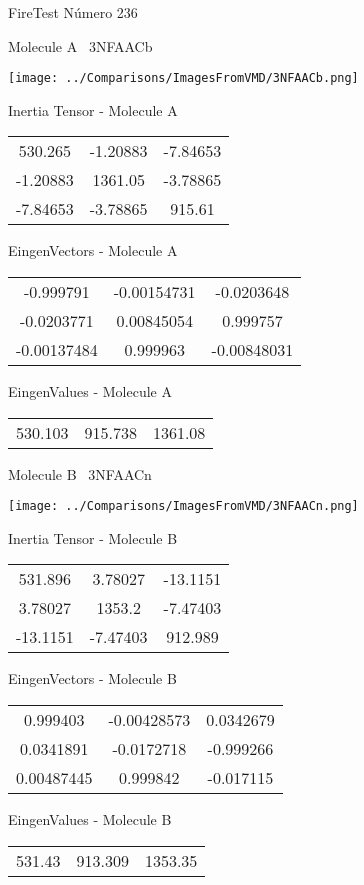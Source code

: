 \vtab[-3cm]
\begin{center}
{\large FireTest \tab Número 236}
\end{center}
\begin{multicols}{2}
\begin{center}

Molecule A \
3NFAACb

\texttt{[image: ../Comparisons/ImagesFromVMD/3NFAACb.png]}

Inertia Tensor - Molecule A \\
\begin{tabular}{|c c c|}
530.265	 & 	-1.20883	 & 	-7.84653	 \\
-1.20883	 & 	1361.05	 & 	-3.78865	 \\
-7.84653	 & 	-3.78865	 & 	915.61
\end{tabular}

\vtab
 EingenVectors - Molecule A     \\
\begin{tabular}{|c c c|}
-0.999791	 & 	-0.00154731	 & 	-0.0203648	 \\
-0.0203771	 & 	0.00845054	 & 	0.999757	 \\
-0.00137484	 & 	0.999963	 & 	-0.00848031
\end{tabular}

\vtab
 EingenValues - Molecule A     \\
\begin{tabular}{|c c c|}
530.103	 & 	915.738	 & 	1361.08	 \\
\end{tabular}
\columnbreak

Molecule B \
3NFAACn

\texttt{[image: ../Comparisons/ImagesFromVMD/3NFAACn.png]}

Inertia Tensor - Molecule B \\
\begin{tabular}{|c c c|}
531.896	 & 	3.78027	 & 	-13.1151	 \\
3.78027	 & 	1353.2	 & 	-7.47403	 \\
-13.1151	 & 	-7.47403	 & 	912.989
\end{tabular}

\vtab
 EingenVectors - Molecule B     \\
\begin{tabular}{|c c c|}
0.999403	 & 	-0.00428573	 & 	0.0342679	 \\
0.0341891	 & 	-0.0172718	 & 	-0.999266	 \\
0.00487445	 & 	0.999842	 & 	-0.017115
\end{tabular}

\vtab
 EingenValues - Molecule B     \\
\begin{tabular}{|c c c|}
531.43	 & 	913.309	 & 	1353.35	 \\
\end{tabular}

\end{center}
\end{multicols}

